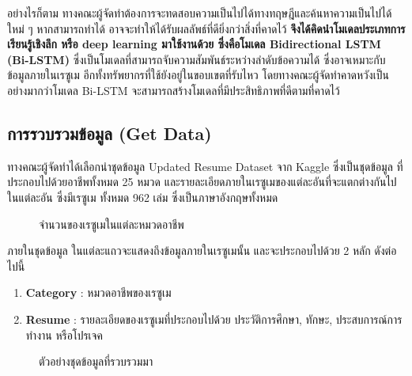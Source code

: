 อย่างไรก็ตาม ทางคณะผู้จัดทำต้องการจะทดสอบความเป็นไปได้ทางทฤษฎีและค้นหาความเป็นไปได้ใหม่ ๆ หากสามารถทำได้ อาจจะทำให้ได้รับผลลัพธ์ที่ดียิ่งกว่าสิ่งที่คาดไว้ \textbf{จึงได้คิดนำโมเดลประเภทการเรียนรู้เชิงลึก หรือ deep learning มาใช้งานด้วย
ซึ่งคือโมเดล Bidirectional LSTM (Bi-LSTM)} ซึ่งเป็นโมเดลที่สามารถจับความสัมพันธ์ระหว่างลำดับข้อความได้ ซึ่งอาจเหมาะกับข้อมูลภายในเรซูเม อีกทั้งทรัพยากรที่ใช้ยังอยู่ในขอบเขตที่รับไหว โดยทางคณะผู้จัดทำคาดหวังเป็นอย่างมากว่าโมเดล Bi-LSTM จะสามารถสร้างโมเดลที่มีประสิทธิภาพที่ดีตามที่คาดไว้

\subsection{การรวบรวมข้อมูล (Get Data)}
\label{subsec:Data Collecting}
ทางคณะผู้จัดทำได้เลือกนำชุดข้อมูล Updated Resume Dataset \cite{dataset} จาก Kaggle ซึ่งเป็นชุดข้อมูล
ที่ประกอบไปด้วยอาชีพทั้งหมด 25 หมวด และรายละเอียดภายในเรซูเมของแต่ละอันที่จะแตกต่างกันไปในแต่ละอัน ซึ่งมีเรซูเม
ทั้งหมด 962 เล่ม ซึ่งเป็นภาษาอังกฤษทั้งหมด
\begin{figure}[H]\centering
    \setlength{\fboxrule}{0.2mm} %
    \setlength{\fboxsep}{0.5cm}
    \caption{จำนวนของเรซูเมในแต่ละหมวดอาชีพ}\label{fig:datasetCategory}
\end{figure}
ภายในชุดข้อมูล ในแต่ละแถวจะแสดงถึงข้อมูลภายในเรซูเมนั้น และจะประกอบไปด้วย 2 หลัก ดังต่อไปนี้
\begin{enumerate}
    \item \textbf{Category} : หมวดอาชีพของเรซูเม
    \item \textbf{Resume} : รายละเอียดของเรซูเมที่ประกอบไปด้วย ประวัติการศึกษา, ทักษะ, ประสบการณ์การทำงาน หรือโปรเจค
\end{enumerate}
\begin{figure}[H]\centering
    \setlength{\fboxrule}{0.2mm} %
    \setlength{\fboxsep}{0.5cm}
    \caption{ตัวอย่างชุดข้อมูลที่รวบรวมมา}\label{fig:datasetData}
\end{figure}
